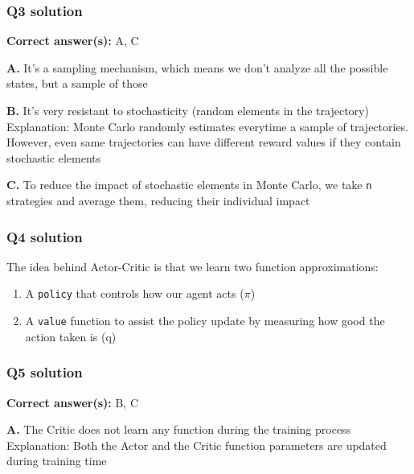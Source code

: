 \documentclass[11pt,a4paper]{article}
\begin{document}
\subsubsection{Q3 solution}\label{q3-solution}

\textbf{Correct answer(s):} A, C

\textbf{A.} It's a sampling mechanism, which means we don't analyze all the possible states, but a sample of those

\textbf{B.} It's very resistant to stochasticity (random elements in the trajectory) Explanation: Monte Carlo randomly estimates everytime a sample of trajectories. However, even same trajectories can have different reward values if they contain stochastic elements

\textbf{C.} To reduce the impact of stochastic elements in Monte Carlo, we take \texttt{n} strategies and average them, reducing their individual impact

\subsubsection{Q4 solution}\label{q4-solution}

The idea behind Actor-Critic is that we learn two function approximations:

\begin{enumerate}
\def\labelenumi{\arabic{enumi}.}
\tightlist
\item
  A \texttt{policy} that controls how our agent acts (\(\pi\))
\item
  A \texttt{value} function to assist the policy update by measuring how good the action taken is (q)
\end{enumerate}


\subsubsection{Q5 solution}\label{q5-solution}

\textbf{Correct answer(s):} B, C

\textbf{A.} The Critic does not learn any function during the training process Explanation: Both the Actor and the Critic function parameters are updated during training time
\end{document}
